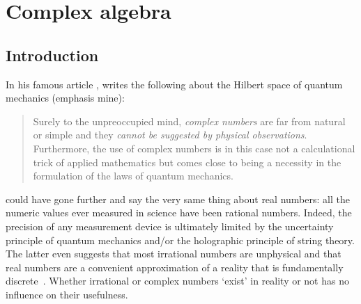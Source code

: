 \FloatBarrier


\section{Complex algebra}
\subsection{Introduction}
In his famous article , \textcite{wigner1995unreasonable} writes the following about the Hilbert space of quantum mechanics (emphasis mine):
\begin{quotation}
Surely to the unpreoccupied mind, \emph{complex numbers} are far from natural or simple and they \emph{cannot be suggested by physical observations}.
Furthermore, the use of complex numbers is in this case not a calculational trick of applied mathematics but comes close to being a necessity in the formulation of the laws of quantum mechanics.
\end{quotation}
 could have gone further and say the very same thing about real numbers:
all the numeric values ever measured in science have been rational numbers.
Indeed, the precision of any measurement device is ultimately limited by the uncertainty principle of quantum mechanics and/or the holographic principle of string theory.
The latter even suggests that most irrational numbers are unphysical and that real numbers are a convenient approximation of a reality that is fundamentally discrete~\parencite[][for instance]{hooft2014cellular}.
Whether irrational or complex numbers `exist' in reality or not has no influence on their usefulness.

